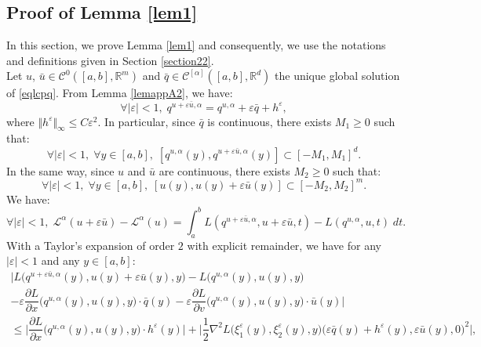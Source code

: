 \documentclass[english,11pt,reqno]{smfart}
\def\di{\displaystyle}
\def\eps{\varepsilon}
\newcommand{\R}{\mathbb{R}}
\newcommand{\LL}{\mathcal{L}}
\newcommand{\CC}{\mathscr{C}}
\begin{document}
\subsection{Proof of Lemma \ref{lem1}}\label{appAd}
In this section, we prove Lemma \ref{lem1} and consequently, we use the notations and definitions given in Section \ref{section22}. \\

Let $u$, $\bar{u} \in \CC^0 ([a,b],\R^m )$ and $\bar{q} \in \CC^{[\alpha]} ( [a,b], \R^d )$ the unique global solution of \eqref{eqlcpq}. From Lemma \ref{lemappA2}, we have:
\begin{equation}\label{eqAd-1}
\forall \vert \eps \vert < 1, \; q^{u+\eps \bar{u},\alpha} = q^{u,\alpha} + \eps \bar{q} + h^{\eps},
\end{equation}
where $\Vert h^{\eps} \Vert_{\infty} \leq C \eps^2$. In particular, since $\bar{q}$ is continuous, there exists $M_1 \geq 0$ such that:
\begin{equation}
\forall \vert \eps \vert < 1, \; \forall y \in [a,b], \; [q^{u,\alpha}(y),q^{u+\eps \bar{u},\alpha}(y)] \subset [-M_1,M_1]^d.
\end{equation}
In the same way, since $u$ and $\bar{u}$ are continuous, there exists $M_2 \geq 0$ such that:
\begin{equation}
\forall \vert \eps \vert < 1, \; \forall y \in [a,b], \; [u(y),u(y)+\eps \bar{u}(y)] \subset [-M_2,M_2]^m.
\end{equation}
We have:
\begin{equation}\label{eqAd-2}
\forall \vert \eps \vert < 1, \; \LL^\alpha(u+\eps \bar{u})-\LL^\alpha(u) = \di \int_a^b L(q^{u+\eps \bar{u},\alpha},u+\eps \bar{u},t) - L(q^{u,\alpha},u,t) \; dt .
\end{equation}
With a Taylor's expansion of order $2$ with explicit remainder, we have for any $\vert \eps \vert < 1$ and any $y \in [a,b]$:
\begin{multline}
\Big\vert L\big(q^{u+\eps \bar{u},\alpha}(y),u(y)+\eps \bar{u}(y),y\big) - L\big(q^{u,\alpha}(y),u(y),y\big) \\ - \eps \dfrac{\partial L}{\partial x} \big(q^{u,\alpha}(y),u(y),y\big) \cdot \bar{q}(y) - \eps \dfrac{\partial L}{\partial v} \big(q^{u,\alpha}(y),u(y),y\big) \cdot \bar{u}(y) \Big\vert \\ \leq \Big\vert \dfrac{\partial L}{\partial x} \big(q^{u,\alpha}(y),u(y),y\big) \cdot h^{\eps}(y) \Big\vert  + \Big\vert \dfrac{1}{2} \nabla^2 L \big(\xi^\eps_1(y),\xi^\eps_2(y),y\big) \big(\eps \bar{q}(y)+h^\eps(y),\eps \bar{u}(y),0\big)^2 \Big\vert,
\end{multline}
\end{document}
